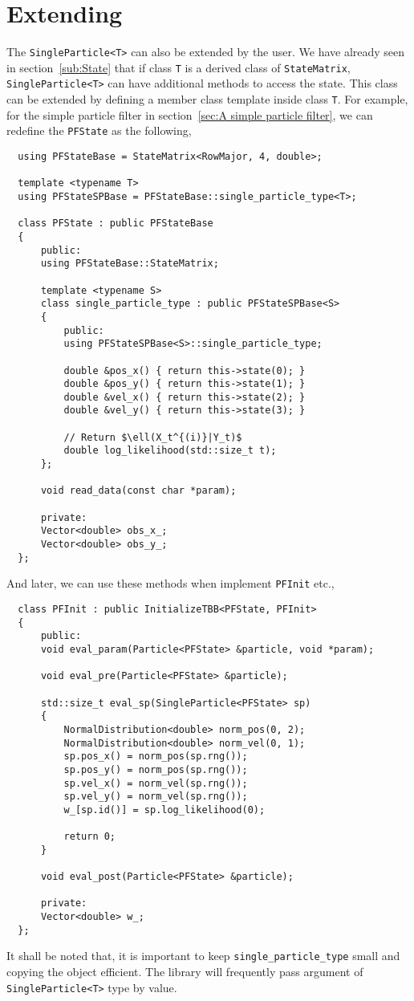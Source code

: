 \section{Extending \protect\spt}
\label{sec:Extending SP}

The \verb|SingleParticle<T>| can also be extended by the user. We have already
seen in section~\ref{sub:State} that if class \verb|T| is a derived class of
\verb|StateMatrix|, \verb|SingleParticle<T>| can have additional methods to
access the state. This class can be extended by defining a member class
template inside class \verb|T|. For example, for the simple particle filter in
section~\ref{sec:A simple particle filter}, we can redefine the \verb|PFState|
as the following,
\begin{Verbatim}
  using PFStateBase = StateMatrix<RowMajor, 4, double>;

  template <typename T>
  using PFStateSPBase = PFStateBase::single_particle_type<T>;

  class PFState : public PFStateBase
  {
      public:
      using PFStateBase::StateMatrix;

      template <typename S>
      class single_particle_type : public PFStateSPBase<S>
      {
          public:
          using PFStateSPBase<S>::single_particle_type;

          double &pos_x() { return this->state(0); }
          double &pos_y() { return this->state(1); }
          double &vel_x() { return this->state(2); }
          double &vel_y() { return this->state(3); }

          // Return $\ell(X_t^{(i)}|Y_t)$
          double log_likelihood(std::size_t t);
      };

      void read_data(const char *param);

      private:
      Vector<double> obs_x_;
      Vector<double> obs_y_;
  };
\end{Verbatim}
And later, we can use these methods when implement \verb|PFInit| etc.,
\begin{Verbatim}
  class PFInit : public InitializeTBB<PFState, PFInit>
  {
      public:
      void eval_param(Particle<PFState> &particle, void *param);

      void eval_pre(Particle<PFState> &particle);

      std::size_t eval_sp(SingleParticle<PFState> sp)
      {
          NormalDistribution<double> norm_pos(0, 2);
          NormalDistribution<double> norm_vel(0, 1);
          sp.pos_x() = norm_pos(sp.rng());
          sp.pos_y() = norm_pos(sp.rng());
          sp.vel_x() = norm_vel(sp.rng());
          sp.vel_y() = norm_vel(sp.rng());
          w_[sp.id()] = sp.log_likelihood(0);

          return 0;
      }

      void eval_post(Particle<PFState> &particle);

      private:
      Vector<double> w_;
  };
\end{Verbatim}
It shall be noted that, it is important to keep \verb|single_particle_type|
small and copying the object efficient. The library will frequently pass
argument of \verb|SingleParticle<T>| type by value.

